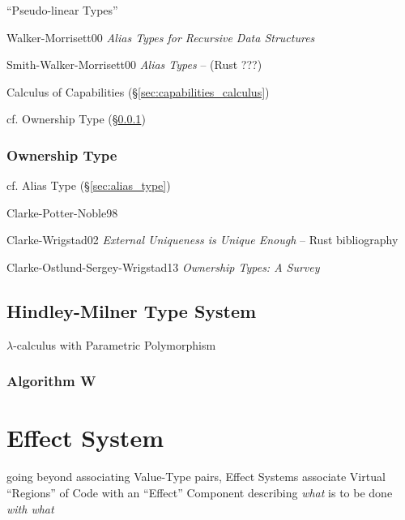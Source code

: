 
``Pseudo-linear Types''

Walker-Morrisett00 \emph{Alias Types for Recursive Data Structures}

Smith-Walker-Morrisett00 \emph{Alias Types} -- (Rust ???) %

Calculus of Capabilities (\S\ref{sec:capabilities_calculus})

cf. Ownership Type (\S\ref{sec:ownership_type})



\subsubsection{Ownership Type}\label{sec:ownership_type}

cf. Alias Type (\S\ref{sec:alias_type})

Clarke-Potter-Noble98

Clarke-Wrigstad02 \emph{External Uniqueness is Unique Enough} -- Rust
bibliography

Clarke-Ostlund-Sergey-Wrigstad13 \emph{Ownership Types: A Survey}



\subsection{Hindley-Milner Type System}\label{sec:hindley_milner}

$\lambda$-calculus with Parametric Polymorphism



\subsubsection{Algorithm W}\label{sec:algorithm_w}



\section{Effect System}\label{sec:effect_system}

going beyond associating Value-Type pairs, Effect Systems associate
Virtual ``Regions'' of Code with an ``Effect'' Component describing
\emph{what} is to be done \emph{with what}


